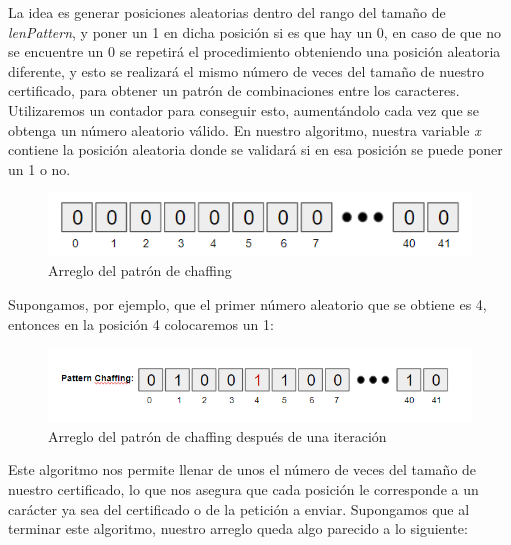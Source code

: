 \documentclass[12pt, a4paper, titlepage]{report}
\begin{document}
    		    La idea es generar posiciones aleatorias dentro del rango del tamaño de \textit{lenPattern}, y poner un 1 en dicha posición si es que hay un 0, en caso de que no se encuentre un 0 se repetirá el procedimiento obteniendo una posición aleatoria diferente, y esto se realizará el mismo número de veces del tamaño de nuestro certificado, para obtener un patrón de combinaciones entre los caracteres. Utilizaremos un contador para conseguir esto, aumentándolo cada vez que se obtenga un número aleatorio válido. En nuestro algoritmo, nuestra variable \textit{x} contiene la posición aleatoria donde se validará si en esa posición se puede poner un 1 o no.\\
    		    
    		    \begin{figure}[H]
        			\begin{center}	                  \includegraphics[width=14cm]{./imagenes/Disenio/Componente_1/algorithm1_1.png}
    				\caption{Arreglo del patrón de chaffing}
        			\end{center}
        		\end{figure}
            	
    		    Supongamos, por ejemplo, que el primer número aleatorio que se obtiene es 4, entonces en la posición 4 colocaremos un 1: 
    		    
    		    \begin{figure}[H]
        			\begin{center}	                  \includegraphics[width=14cm]{./imagenes/Disenio/Componente_1/algorithm1_2.png}
    				\caption{Arreglo del patrón de chaffing después de una iteración}
        			\end{center}
        		\end{figure}
        		
        		Este algoritmo nos permite llenar de unos el número de veces del tamaño de nuestro certificado, lo que nos asegura que cada posición le corresponde a un carácter ya sea del certificado o de la petición a enviar. Supongamos que al terminar este algoritmo, nuestro arreglo queda algo parecido a lo siguiente:
        		
\end{document}
